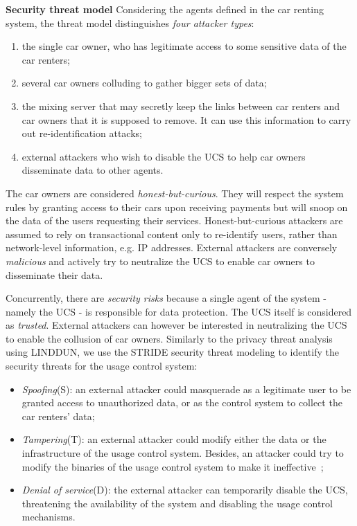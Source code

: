 \textbf{Security threat model}
\label{ss_sec_threats}
Considering the agents defined in the car renting system, the threat model distinguishes \emph{four attacker types}:
\begin{enumerate}
    \item the single car owner, who has legitimate access to some sensitive data of the car renters;
    \item several car owners colluding to gather bigger sets of data;
    \item the mixing server that may secretly keep the links between car renters and car owners that it is supposed to remove. It can use this information to carry out re-identification attacks; 
    \item external attackers who wish to disable the UCS to help car owners disseminate data to other agents.
\end{enumerate}

The car owners are considered \emph{honest-but-curious}. They will respect the system rules by granting access to their cars upon receiving payments but will snoop on the data of the users requesting their services. Honest-but-curious attackers are assumed to rely on transactional content only to re-identify users, rather than network-level information, e.g. IP addresses. External attackers are conversely \emph{malicious} and actively try to neutralize the UCS to enable car owners to disseminate their data.

Concurrently, there are \emph{security risks} because a single agent of the system - namely the UCS - is responsible for data protection. The UCS itself is considered as \emph{trusted}. External attackers can however be interested in neutralizing the UCS to enable the collusion of car owners. Similarly to the privacy threat analysis using LINDDUN, we use the STRIDE security threat modeling \cite{Howard2006} to identify the security threats for the usage control system:
\begin{itemize}
    \item \emph{Spoofing}(S): an external attacker could masquerade as a legitimate user to be granted access to unauthorized data, or as the control system to collect the car renters' data;
    \item \emph{Tampering}(T): an external attacker could modify either the data or the infrastructure of the usage control system. Besides, an attacker could try to modify the binaries of the usage control system to make it ineffective~\cite{Kelbert2018};
    \item \emph{Denial of service}(D): the external attacker can temporarily disable the UCS, threatening the availability of the system and disabling the usage control mechanisms.
\end{itemize}

